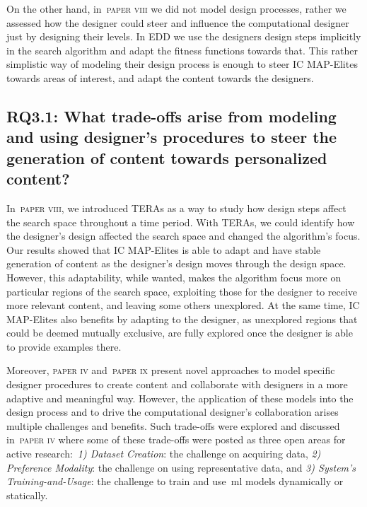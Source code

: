 On the other hand, in~\textsc{paper viii} we did not model design processes, rather we assessed how the designer could steer and influence the computational designer just by designing their levels. In EDD we use the designers design steps implicitly in the search algorithm and adapt the fitness functions towards that. This rather simplistic way of modeling their design process is enough to steer IC MAP-Elites towards areas of interest, and adapt the content towards the designers.

\subsection[Research Question 3.1]{RQ3.1: What trade-offs arise from modeling and using designer's procedures to steer the generation of content towards personalized content?}

In~\textsc{paper viii}, we introduced TERAs as a way to study how design steps affect the search space throughout a time period. With TERAs, we could identify how the designer's design affected the search space and changed the algorithm's focus. Our results showed that IC MAP-Elites is able to adapt and have stable generation of content as the designer's design moves through the design space. However, this adaptability, while wanted, makes the algorithm focus more on particular regions of the search space, exploiting those for the designer to receive more relevant content, and leaving some others unexplored. At the same time, IC MAP-Elites also benefits by adapting to the designer, as unexplored regions that could be deemed mutually exclusive, are fully explored once the designer is able to provide examples there.




Moreover, \textsc{paper iv} and~\textsc{paper ix} present novel approaches to model specific designer procedures to create content and collaborate with designers in a more adaptive and meaningful way. However, the application of these models into the design process and to drive the computational designer's collaboration arises multiple challenges and benefits. Such trade-offs were explored and discussed in~\textsc{paper iv} where some of these trade-offs were posted as three open areas for active research:~\textit{1) Dataset Creation}: the challenge on acquiring data, \textit{2) Preference Modality}: the challenge on using representative data, and \textit{3) System's Training-and-Usage}: the challenge to train and use~\acrshort{ml} models dynamically or statically.  

